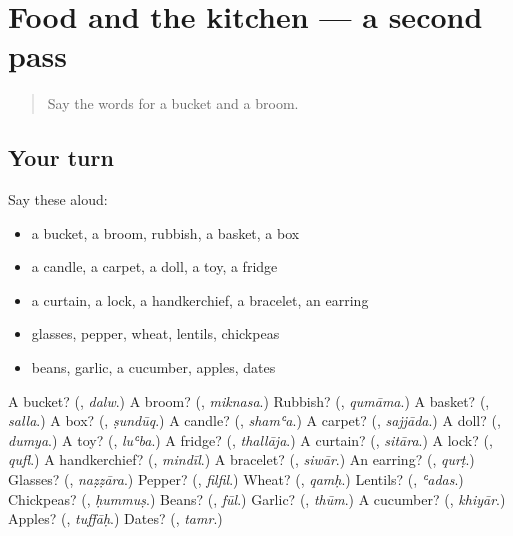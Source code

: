 \section[(dialogue)]{Food and the kitchen — a second pass}

\label{lesson:AR-R129-second-pass-food-and-the-kitchen}



\begin{quote}
Say the words for a bucket and a broom.
\end{quote}

\subsection*{Your turn}
Say these aloud:

\begin{itemize}
\raggedright
  \item a bucket, a broom, rubbish, a basket, a box
  \item a candle, a carpet, a doll, a toy, a fridge
  \item a curtain, a lock, a handkerchief, a bracelet, an earring
  \item glasses, pepper, wheat, lentils, chickpeas
  \item beans, garlic, a cucumber, apples, dates
\end{itemize}

\begin{tcolorbox}[breakable,colback=teal!4,colframe=teal!35!black,title={Before you move on}]
A bucket? (\textbf{}, \emph{dalw}.) A broom? (\textbf{}, \emph{miknasa}.) Rubbish? (\textbf{}, \emph{qumāma}.) A basket? (\textbf{}, \emph{salla}.) A box? (\textbf{}, \emph{ṣundūq}.) A candle? (\textbf{}, \emph{shamʿa}.) A carpet? (\textbf{}, \emph{sajjāda}.) A doll? (\textbf{}, \emph{dumya}.) A toy? (\textbf{}, \emph{luʿba}.) A fridge? (\textbf{}, \emph{thallāja}.) A curtain? (\textbf{}, \emph{sitāra}.) A lock? (\textbf{}, \emph{qufl}.) A handkerchief? (\textbf{}, \emph{mindīl}.) A bracelet? (\textbf{}, \emph{siwār}.) An earring? (\textbf{}, \emph{qurṭ}.) Glasses? (\textbf{}, \emph{naẓẓāra}.) Pepper? (\textbf{}, \emph{filfil}.) Wheat? (\textbf{}, \emph{qamḥ}.) Lentils? (\textbf{}, \emph{ʿadas}.) Chickpeas? (\textbf{}, \emph{ḥummuṣ}.) Beans? (\textbf{}, \emph{fūl}.) Garlic? (\textbf{}, \emph{thūm}.) A cucumber? (\textbf{}, \emph{khiyār}.) Apples? (\textbf{}, \emph{tuffāḥ}.) Dates? (\textbf{}, \emph{tamr}.)
\end{tcolorbox}
